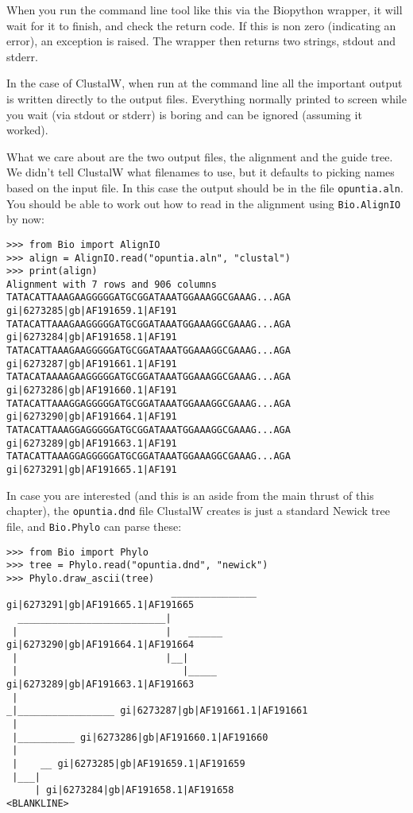 When you run the command line tool like this via the Biopython wrapper,
it will wait for it to finish, and check the return code. If this is
non zero (indicating an error), an exception is raised. The wrapper
then returns two strings, stdout and stderr.

In the case of ClustalW, when run at the command line all the important
output is written directly to the output files. Everything normally printed to
screen while you wait (via stdout or stderr) is boring and can be
ignored (assuming it worked).

What we care about are the two output files, the alignment and the guide
tree. We didn't tell ClustalW what filenames to use, but it defaults to
picking names based on the input file. In this case the output should be
in the file \verb|opuntia.aln|.
You should be able to work out how to read in the alignment using
\verb|Bio.AlignIO| by now:

\begin{verbatim}
>>> from Bio import AlignIO
>>> align = AlignIO.read("opuntia.aln", "clustal")
>>> print(align)
Alignment with 7 rows and 906 columns
TATACATTAAAGAAGGGGGATGCGGATAAATGGAAAGGCGAAAG...AGA gi|6273285|gb|AF191659.1|AF191
TATACATTAAAGAAGGGGGATGCGGATAAATGGAAAGGCGAAAG...AGA gi|6273284|gb|AF191658.1|AF191
TATACATTAAAGAAGGGGGATGCGGATAAATGGAAAGGCGAAAG...AGA gi|6273287|gb|AF191661.1|AF191
TATACATAAAAGAAGGGGGATGCGGATAAATGGAAAGGCGAAAG...AGA gi|6273286|gb|AF191660.1|AF191
TATACATTAAAGGAGGGGGATGCGGATAAATGGAAAGGCGAAAG...AGA gi|6273290|gb|AF191664.1|AF191
TATACATTAAAGGAGGGGGATGCGGATAAATGGAAAGGCGAAAG...AGA gi|6273289|gb|AF191663.1|AF191
TATACATTAAAGGAGGGGGATGCGGATAAATGGAAAGGCGAAAG...AGA gi|6273291|gb|AF191665.1|AF191
\end{verbatim}

In case you are interested (and this is an aside from the main thrust of this
chapter), the \texttt{opuntia.dnd} file ClustalW creates is just a standard
Newick tree file, and \verb|Bio.Phylo| can parse these:


\begin{verbatim}
>>> from Bio import Phylo
>>> tree = Phylo.read("opuntia.dnd", "newick")
>>> Phylo.draw_ascii(tree)
                             _______________ gi|6273291|gb|AF191665.1|AF191665
  __________________________|
 |                          |   ______ gi|6273290|gb|AF191664.1|AF191664
 |                          |__|
 |                             |_____ gi|6273289|gb|AF191663.1|AF191663
 |
_|_________________ gi|6273287|gb|AF191661.1|AF191661
 |
 |__________ gi|6273286|gb|AF191660.1|AF191660
 |
 |    __ gi|6273285|gb|AF191659.1|AF191659
 |___|
     | gi|6273284|gb|AF191658.1|AF191658
<BLANKLINE>
\end{verbatim}

